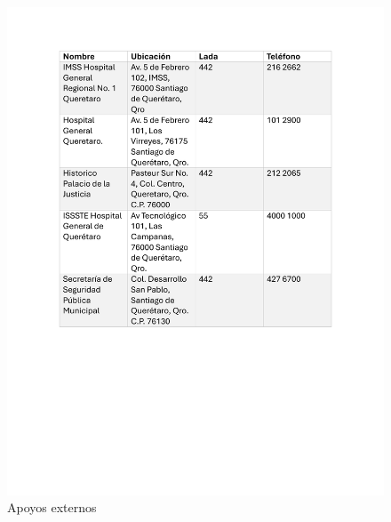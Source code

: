     \begin{figure}[H]
        \centering
        \includegraphics[scale=0.25]{13/img/apoyosExternos.pdf}
        \caption{Apoyos externos}
        \label{fig:Apoyos externos}
    \end{figure}
